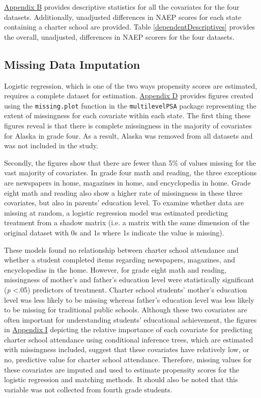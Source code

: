 \documentclass[letterpaper,12pt]{article} %
\begin{document}


\hyperref[appendixB]{Appendix B} provides descriptive statistics for all the covariates for the four datasets. Additionally, unadjusted differences in NAEP scores for each state containing a charter school are provided. Table \ref{dependentDescriptives} provides the overall, unadjusted, differences in NAEP scorers for the four datasets.



\subsection{Missing Data Imputation}

Logistic regression, which is one of the two ways propensity scores are estimated, requires a complete dataset for estimation. \hyperref[appendixD]{Appendix D} provides figures created using the \texttt{missing.plot} function in the \texttt{multilevelPSA} package representing the extent of missingness for each covariate within each state. The first thing these figures reveal is that there is complete missingness in the majority of covariates for Alaska in grade four. As a result, Alaska was removed from all datasets and was not included in the study. 

Secondly, the figures show that there are fewer than 5\% of values missing for the vast majority of covariates. In grade four math and reading, the three exceptions are newspapers in home, magazines in home, and encyclopedia in home. Grade eight math and reading also show a higher rate of missingness in these three covariates, but also in parents' education level. To examine whether data are missing at random, a logistic regression model was estimated predicting treatment from a shadow matrix (i.e. a matrix with the same dimension of the original dataset with 0s and 1s where 1s indicate the value is missing). 

These models found no relationship between charter school attendance and whether a student completed items regarding newspapers, magazines, and encyclopedias in the home. However, for grade eight math and reading, missingness of mother's and father's education level were statistically significant (\textit{p} \textless .05) predictors of treatment. Charter school students' mother's education level was less likely to be missing whereas father's education level was less likely to be missing for traditional public schools. Although these two covariates are often important for understanding students' educational achievement, the figures in \hyperref[appendixI]{Appendix I} depicting the relative importance of each covariate for predicting charter school attendance using conditional inference trees, which are estimated with missingness included, suggest that these covariates have relatively low, or no, predictive value for charter school attendance. Therefore, missing values for these covariates are imputed and used to estimate propensity scores for the logistic regression and matching methods. It should also be noted that this variable was not collected from fourth grade students.
\end{document}
